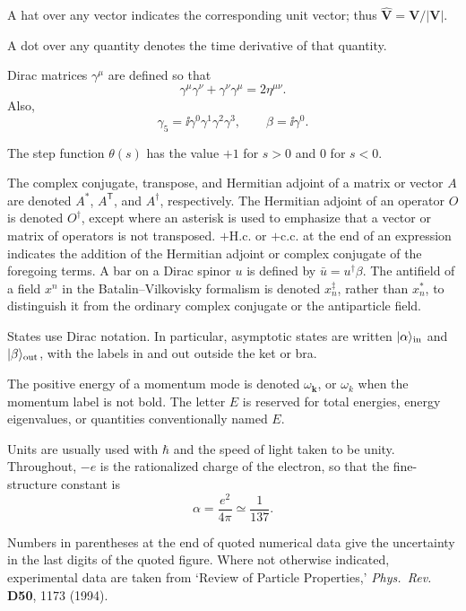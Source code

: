 A hat over any vector indicates the corresponding unit vector; thus
\(\widehat{\mathbf V}=\mathbf V/\lvert\mathbf V\rvert\).

A dot over any quantity denotes the time derivative of that quantity.

Dirac matrices \(\gamma^\mu\) are defined so that
\[
  \gamma^\mu\gamma^\nu+\gamma^\nu\gamma^\mu=2\eta^{\mu\nu}.
\]
Also,
\[
  \gamma_5=\ii\gamma^0\gamma^1\gamma^2\gamma^3,
  \qquad
  \beta=\ii\gamma^0.
\]

The step function \(\theta(s)\) has the value \(+1\) for \(s>0\) and \(0\) for
\(s<0\).

The complex conjugate, transpose, and Hermitian adjoint of a matrix or vector
\(A\) are denoted \(A^*\), \(A^{\mathsf T}\), and \(A^\dagger\), respectively.
The Hermitian adjoint of an operator \(O\) is denoted \(O^\dagger\), except
where an asterisk is used to emphasize that a vector or matrix of operators is
not transposed. \(+\mathrm{H.c.}\) or \(+\mathrm{c.c.}\) at the end of an
expression indicates the addition of the Hermitian adjoint or complex
conjugate of the foregoing terms. A bar on a Dirac spinor \(u\) is defined by
\(\bar u=u^\dagger\beta\). The antifield of a field \(x^n\) in the
Batalin--Vilkovisky formalism is denoted \(x_n^{\ddagger}\), rather than
\(x_n^*\), to distinguish it from the ordinary complex conjugate or the
antiparticle field.

States use Dirac notation. In particular, asymptotic states are written
\(\lvert \alpha\rangle_{\mathrm{in}}\) and \(\lvert \beta\rangle_{\mathrm{out}}\), with the
labels \(\mathrm{in}\) and \(\mathrm{out}\) outside the ket or bra.

The positive energy of a momentum mode is denoted
\(\omega_{\mathbf k}\), or \(\omega_k\) when the momentum label is not
bold. The letter \(E\) is reserved for total energies, energy eigenvalues, or
quantities conventionally named \(E\).

Units are usually used with \(\hbar\) and the speed of light taken to be unity.
Throughout, \(-e\) is the rationalized charge of the electron, so that the
fine-structure constant is
\[
  \alpha=\frac{e^2}{4\pi}\simeq\frac{1}{137}.
\]

Numbers in parentheses at the end of quoted numerical data give the
uncertainty in the last digits of the quoted figure. Where not otherwise
indicated, experimental data are taken from `Review of Particle Properties,'
\emph{Phys.\ Rev.} \textbf{D50}, 1173 (1994).
